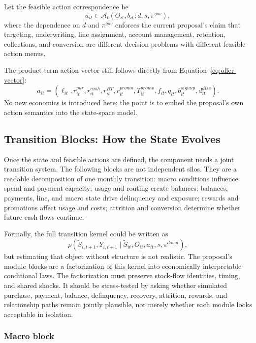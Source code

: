 \documentclass[11pt]{article}
\newcommand{\1}{\mathbf{1}}
\begin{document}
Let the feasible action correspondence be
\begin{equation}
  a_{it}\in\mathcal{A}_{t}(O_{it},b_{it}^{-};d,s,\pi^{gov}),
  \label{eq:ss-feasible-actions}
\end{equation}
where the dependence on $d$ and $\pi^{gov}$ enforces the current proposal's
claim that targeting, underwriting, line assignment, account management,
retention, collections, and conversion are different decision problems with
different feasible action menus.

The product-term action vector still follows directly from
Equation~\eqref{eq:offer-vector}:
\begin{equation}
  a_{it}
  =
  (\ell_{it},r^{pur}_{it},r^{cash}_{it},r^{BT}_{it},r^{promo}_{it},
   T^{promo}_{it},f_{it},q_{it},b_{it}^{signup},d_{it}^{disc}).
  \label{eq:ss-action-vector}
\end{equation}
No new economics is introduced here; the point is to embed the proposal's own
action semantics into the state-space model.

\subsection{Transition Blocks: How the State Evolves}

Once the state and feasible actions are defined, the component needs a joint
transition system. The following blocks are not independent silos. They are a
readable decomposition of one monthly transition: macro conditions influence
spend and payment capacity; usage and routing create balances; balances,
payments, line, and macro state drive delinquency and exposure; rewards and
promotions affect usage and costs; attrition and conversion determine whether
future cash flows continue.

Formally, the full transition kernel could be written as
\[
  p(\widetilde S_{i,t+1},Y_{i,t+1}\mid \widetilde S_{it},O_{it},a_{it},s,\pi^{down}),
\]
but estimating that object without structure is not realistic. The proposal's
module blocks are a factorization of this kernel into economically interpretable
conditional laws. The factorization must preserve stock-flow identities,
timing, and shared shocks. It should be stress-tested by asking whether
simulated purchase, payment, balance, delinquency, recovery, attrition, rewards,
and relationship paths remain jointly plausible, not merely whether each module
looks acceptable in isolation.

\subsubsection{Macro block}
\label{subsec:state-space-macro-block}
\end{document}
